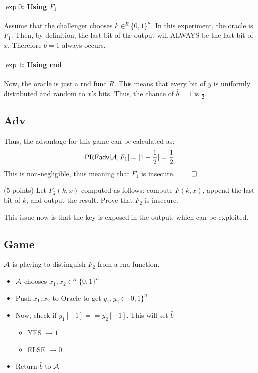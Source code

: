 \documentclass[12pt]{article}
\begin{document}
\begin{problem}
\begin{solution}
\paragraph{$\exp 0$: Using $F_1$}
Assume that the challenger chooses $k \in^R \{0, 1\}^n$. In this experiment, the oracle is $F_1$. Then, by definition, the last bit of the output will ALWAYS be the last bit of $x$. Therefore $\hat{b} = 1$ always occurs.

\paragraph{$\exp 1$: Using rnd}
Now, the oracle is just a rnd func $R$. This means that every bit of $y$ is uniformly distributed and random to $x$'s bits. Thus, the chance of $\hat{b} = 1$ is $\frac{1}{2}$.

\subsection*{Adv}
Thus, the advantage for this game can be calculated as:
\begin{equation*}
  \textrm{PRF}\textsf{adv}[\mathcal{A}, F_1] = |1 - \frac{1}{2}| = \frac{1}{2}
\end{equation*}
This is non-negligible, thus meaning that $F_1$ is insecure. $\qed$
\end{solution}

\begin{ppart} (5 points)
Let $F_2(k,x)$ computed as follows: compute $F(k, x)$, append the last bit of $k$, and output the result. Prove that $F_2$ is insecure.
\end{ppart}

\begin{solution}
This issue now is that the key is exposed in the output, which can be exploited.

\subsection*{Game}
$\mathcal{A}$ is playing to distinguish $F_2$ from a rnd function.
\begin{itemize}
  \item $\mathcal{A}$ chooses $x_1, x_2 \in^R \{0, 1\}^n$
  \item Push $x_1, x_2$ to $\text{Oracle}$ to get $y_1, y_2 \in \{0, 1\}^n$
  \item Now, check if $y_1[-1] == y_2[-1]$. This will set $\hat{b}$
  \begin{itemize}
    \item YES $\to 1$
    \item ELSE $\to 0$
  \end{itemize}
  \item Return $\hat{b}$ to $\mathcal{A}$
\end{itemize}


\end{solution}
\end{problem}
\end{document}
